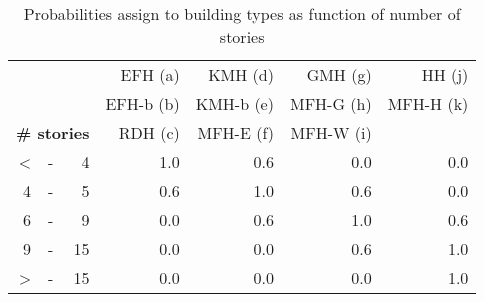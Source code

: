 \begin{table}[htb]
  \centering
  \caption{Probabilities assign to building types as function of number of
  stories}
  \label{tab:pst}
  \begin{tabular}{rcr rrrr}

    \toprule
    &&&
    EFH (a)  & KMH (d)   & GMH (g)   & HH (j) \\ 
    &&&
    EFH-b (b)& KMH-b (e)& MFH-G (h)& MFH-H (k)\\
    \multicolumn{3}{c}{\textbf{\# stories}}& 
    RDH (c)   & MFH-E (f)& MFH-W (i)& \\
    \midrule
\textless &-&    4     & 1.0 & 0.6 & 0.0 & 0.0 \\
        4 &-&    5     & 0.6 & 1.0 & 0.6 & 0.0 \\
        6 &-&    9     & 0.0 & 0.6 & 1.0 & 0.6 \\
        9 &-&   15     & 0.0 & 0.0 & 0.6 & 1.0 \\
\textgreater  &-&   15     & 0.0 & 0.0 & 0.0 & 1.0 \\
    \bottomrule
  \end{tabular}
\end{table}
